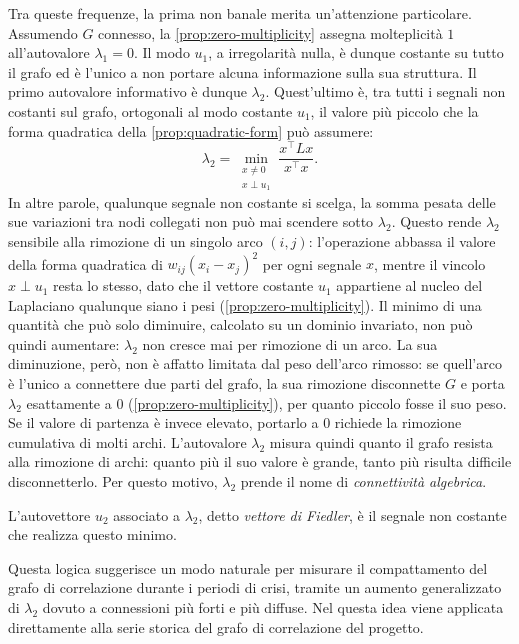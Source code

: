 Tra queste frequenze, la prima non banale merita un'attenzione particolare. Assumendo $G$ connesso, la \cref{prop:zero-multiplicity} assegna molteplicità $1$ all'autovalore $\lambda_1=0$. Il modo $u_1$, a irregolarità nulla, è dunque costante su tutto il grafo ed è l'unico a non portare alcuna informazione sulla sua struttura. Il primo autovalore informativo è dunque $\lambda_2$. Quest'ultimo è, tra tutti i segnali non costanti sul grafo, ortogonali al modo costante $u_1$, il valore più piccolo che la forma quadratica della \cref{prop:quadratic-form} può assumere:
$$\lambda_2 = \min_{\substack{x\neq 0 \\ x\perp u_1}} \frac{x^\top Lx}{x^\top x}.$$
In altre parole, qualunque segnale non costante si scelga, la somma pesata delle sue variazioni tra nodi collegati non può mai scendere sotto $\lambda_2$. Questo rende $\lambda_2$ sensibile alla rimozione di un singolo arco $(i,j)$: l'operazione abbassa il valore della forma quadratica di $w_{ij}(x_i-x_j)^2$ per ogni segnale $x$, mentre il vincolo $x\perp u_1$ resta lo stesso, dato che il vettore costante $u_1$ appartiene al nucleo del Laplaciano qualunque siano i pesi (\cref{prop:zero-multiplicity}). Il minimo di una quantità che può solo diminuire, calcolato su un dominio invariato, non può quindi aumentare: $\lambda_2$ non cresce mai per rimozione di un arco. La sua diminuzione, però, non è affatto limitata dal peso dell'arco rimosso: se quell'arco è l'unico a connettere due parti del grafo, la sua rimozione disconnette $G$ e porta $\lambda_2$ esattamente a $0$ (\cref{prop:zero-multiplicity}), per quanto piccolo fosse il suo peso. Se il valore di partenza è invece elevato, portarlo a $0$ richiede la rimozione cumulativa di molti archi. L'autovalore $\lambda_2$ misura quindi quanto il grafo resista alla rimozione di archi: quanto più il suo valore è grande, tanto più risulta difficile disconnetterlo. Per questo motivo, $\lambda_2$ prende il nome di \emph{connettività algebrica}.

L'autovettore $u_2$ associato a $\lambda_2$, detto \emph{vettore di Fiedler}, è il segnale non costante che realizza questo minimo.

Questa logica suggerisce un modo naturale per misurare il compattamento del grafo di correlazione durante i periodi di crisi, tramite un aumento generalizzato di $\lambda_2$ dovuto a connessioni più forti e più diffuse. Nel  questa idea viene applicata direttamente alla serie storica del grafo di correlazione del progetto.
